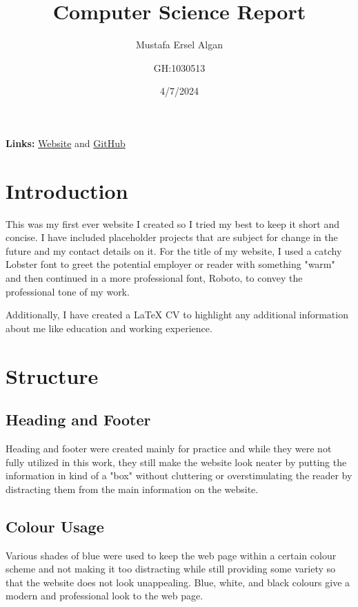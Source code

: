 \documentclass[twoside]{article}
\title{Computer Science Report}
\author{Mustafa Ersel Algan \and GH:1030513}
\date{4/7/2024}
\begin{document}
\maketitle{}

\noindent \textbf{Links:} 
\href{https://qwersel.github.io/ersel.github.io/Ersel%20Algan%20CS%20Project/Ersel%20Algan%20HTML%20Portfolio/Computer%20Science%20Portfolio.html}{Website} 
\textnormal{ and } 
\href{https://github.com/Qwersel/ersel.github.io/tree/4c633d38ef109d9e028325fb7ee654e1b4a1144e/Ersel%20Algan%20CS%20Project}{GitHub}

\section*{Introduction}
This was my first ever website I created so I tried my best to keep it short and concise. I have included placeholder projects that are subject for change in the future and my contact details on it. For the title of my website, I used a catchy Lobster font to greet the potential employer or reader with something "warm" and then continued in a more professional font, Roboto, to convey the professional tone of my work.

\vspace{1em}

\noindent Additionally, I have created a LaTeX CV to highlight any additional information about me like education and working experience.

\section*{Structure}
\subsection*{Heading and Footer}
Heading and footer were created mainly for practice and while they were not fully utilized in this work, they still make the website look neater by putting the information in kind of a "box" without cluttering or overstimulating the reader by distracting them from the main information on the website.

\subsection*{Colour Usage}
Various shades of blue were used to keep the web page within a certain colour scheme and not making it too distracting while still providing some variety so that the website does not look unappealing. Blue, white, and black colours give a modern and professional look to the web page.
\end{document}
